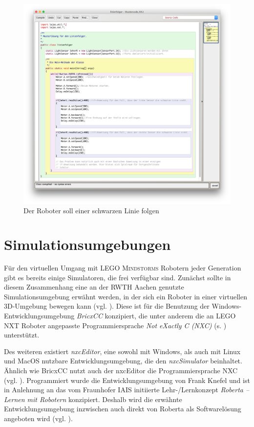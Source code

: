 \documentclass[paper=a4, DIV=calc, BCOR=12mm, twoside=on, onecolumn=on, open = right, titlepage =on, parskip =half-, headsepline = on, footsepline = off, chapterprefix = off, appendixprefix = on, fontsize = 12pt, numbers = noenddot, abstract = on]{scrbook}
\begin{document}
\begin{figure}[htb]
\centering
\includegraphics[width=\textwidth]{images/linienfolger_bluej.png} 
\caption{Der Roboter soll einer schwarzen Linie folgen}
\label{fig:Bsp BlueJ Linienfolger}
\end{figure} 

\par \singlespacing
\section{Simulationsumgebungen}
\label{sec:simulationsumgebungen}
\onehalfspacing
Für den virtuellen Umgang mit \textsc{LEGO Mindstorms} Robotern jeder Generation gibt es bereits einige Simulatoren, die frei verfügbar sind.
Zunächst sollte in diesem Zusammenhang eine an der RWTH Aachen genutzte Simulationsumgebung erwähnt werden, in der sich ein Roboter in einer virtuellen 3D-Umgebung bewegen kann (vgl. \cite{rwth}). Diese ist für die Benutzung der Windows-Entwicklungsumgebung \emph{BricxCC} konzipiert, die unter anderem die an \textsc{LEGO} NXT Roboter angepasste Programmiersprache \emph{Not eXactly C (NXC)} (s. \cite{bricxcc}) unterstützt.

Des weiteren existiert \emph{nxcEditor}, eine sowohl mit Windows, als auch mit Linux und \mbox{MacOS} nutzbare Entwicklungsumgebung, die den \emph{nxcSimulator} beinhaltet. Ähnlich wie BricxCC nutzt auch der nxcEditor die Programmiersprache NXC (vgl. \cite{nxceditor}). Programmiert wurde die Entwicklungsumgebung von Frank Knefel und ist in Anlehnung an das vom Fraunhofer IAIS initiierte Lehr-/Lernkonzept \emph{Roberta -- Lernen mit Robotern} konzipiert. Deshalb wird die erwähnte Entwicklungsumgebung inzwischen auch direkt von Roberta als Softwarelösung angeboten wird (vgl. \cite{roberta}).
\end{document}
